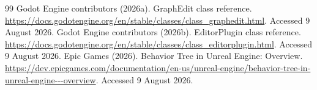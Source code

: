 \begin{thebibliography}{99}
 Godot Engine contributors (2026a). GraphEdit class reference. \url{https://docs.godotengine.org/en/stable/classes/class_graphedit.html}. Accessed 9 August 2026.
 Godot Engine contributors (2026b). EditorPlugin class reference. \url{https://docs.godotengine.org/en/stable/classes/class_editorplugin.html}. Accessed 9 August 2026.
 Epic Games (2026). Behavior Tree in Unreal Engine: Overview. \url{https://dev.epicgames.com/documentation/en-us/unreal-engine/behavior-tree-in-unreal-engine---overview}. Accessed 9 August 2026.
\end{thebibliography}
